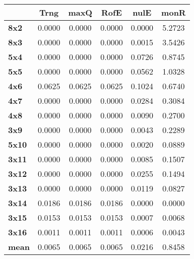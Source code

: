 \begin{tabular}{|l|c|c|c|c|c|}
\hline
&\textbf{Trng}&\textbf{maxQ}&\textbf{RofE}&\textbf{nulE}&\textbf{monR}\\\hline
\textbf{8x2}&0.0000&0.0000&0.0000&0.0000&5.2723\\\hline
\textbf{8x3}&0.0000&0.0000&0.0000&0.0015&3.5426\\\hline
\textbf{5x4}&0.0000&0.0000&0.0000&0.0726&0.8745\\\hline
\textbf{5x5}&0.0000&0.0000&0.0000&0.0562&1.0328\\\hline
\textbf{4x6}&0.0625&0.0625&0.0625&0.1024&0.6740\\\hline
\textbf{4x7}&0.0000&0.0000&0.0000&0.0284&0.3084\\\hline
\textbf{4x8}&0.0000&0.0000&0.0000&0.0090&0.2700\\\hline
\textbf{3x9}&0.0000&0.0000&0.0000&0.0043&0.2289\\\hline
\textbf{5x10}&0.0000&0.0000&0.0000&0.0020&0.0889\\\hline
\textbf{3x11}&0.0000&0.0000&0.0000&0.0085&0.1507\\\hline
\textbf{3x12}&0.0000&0.0000&0.0000&0.0255&0.1494\\\hline
\textbf{3x13}&0.0000&0.0000&0.0000&0.0119&0.0827\\\hline
\textbf{3x14}&0.0186&0.0186&0.0186&0.0000&0.0000\\\hline
\textbf{3x15}&0.0153&0.0153&0.0153&0.0007&0.0068\\\hline
\textbf{3x16}&0.0011&0.0011&0.0011&0.0006&0.0043\\\hline
\textbf{mean}&0.0065&0.0065&0.0065&0.0216&0.8458\\\hline
\end{tabular}
